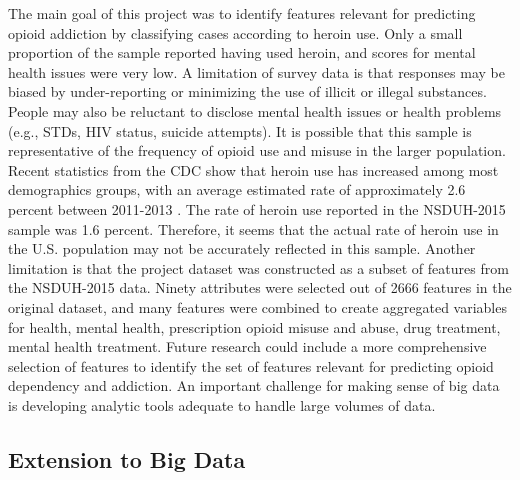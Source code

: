 \documentclass[sigconf]{acmart}
\begin{document}
The main goal of this project was to identify features relevant for predicting 
opioid addiction by classifying cases according to heroin use. Only a small 
proportion of the sample reported having used heroin, and scores for mental
health issues were very low. A limitation of survey data is that responses may 
be biased by under-reporting or minimizing the use of illicit or illegal 
substances. People may also be reluctant to disclose mental health issues or 
health problems (e.g., STDs, HIV status, suicide attempts). It is possible
that this sample is representative of the frequency of opioid use and misuse
in the larger population. Recent statistics from the CDC show that heroin use
has increased among most demographics groups, with an average estimated rate 
of approximately 2.6 percent between 2011-2013 \cite{cdc16}. The rate of heroin 
use reported in the NSDUH-2015 sample was 1.6 percent. Therefore, it seems
that the actual rate of heroin use in the U.S. population may not be accurately
reflected in this sample. Another limitation is that the project dataset was 
constructed as a subset of features from the NSDUH-2015 data. Ninety 
attributes were selected out of 2666 features in the original dataset, and many 
features were combined to create aggregated variables for health, mental 
health, prescription opioid misuse and abuse, drug treatment, mental health
treatment. Future research could include a more comprehensive selection of
features to identify the set of features relevant for predicting opioid
dependency and addiction. An important challenge for making sense of big data 
is developing analytic tools adequate to handle large volumes of data.


\subsection{Extension to Big Data}
\end{document}

